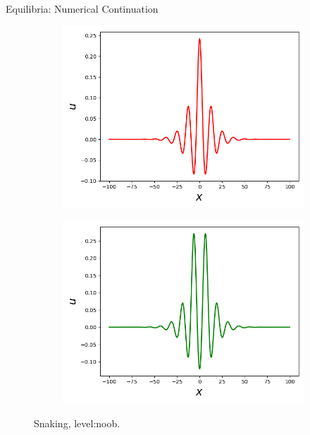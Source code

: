 \documentclass{beamer}
\begin{document}
\begin{frame}{Equilibria: Numerical Continuation}
\begin{figure}[ht]
\begin{subfigure}{.4\textwidth}
  \centering
  \includegraphics[scale=0.2]
  {Figs/shper_1.png}  
  \label{fig:vary_V0}
\end{subfigure}
\begin{subfigure}{.4\textwidth}
  \centering
  \includegraphics[scale = 0.2]
  {Figs/shper_2.png}  
  \label{fig:vary_B}
\end{subfigure}
\caption{Snaking, level:noob.}
\label{fig:sh_snaking}
\end{figure}

\end{frame}
\end{document}
